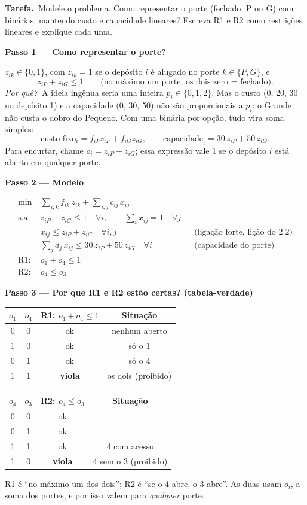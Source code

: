 \documentclass[11pt,a4paper]{article}
\newcommand{\tarefa}{\par\textbf{Tarefa.}\ }
\newcommand{\passo}[1]{\par\medskip\textbf{#1}\par}
\newcommand{\porque}{\textit{Por quê?}\ }
\begin{document}
\tarefa Modele o problema. Como representar o porte (fechado, P ou G) com binárias, mantendo custo e
capacidade lineares? Escreva R1 e R2 como restrições lineares e explique cada uma.

\passo{Passo 1 --- Como representar o porte?}
$z_{ik}\in\{0,1\}$, com $z_{ik}=1$ se o depósito $i$ é alugado no porte $k\in\{P,G\}$, e
\[
  z_{iP} + z_{iG} \le 1 \qquad \text{(no máximo um porte; os dois zero = fechado).}
\]
\porque A ideia ingênua seria uma inteira $p_i\in\{0,1,2\}$. Mas o custo (0, 20, 30 no depósito 1) e a capacidade
(0, 30, 50) não são proporcionais a $p_i$: o Grande não custa o dobro do Pequeno. Com uma binária por opção, tudo vira
soma simples:
\[
  \text{custo fixo}_i = f_{iP}z_{iP} + f_{iG}z_{iG}, \qquad \text{capacidade}_i = 30\,z_{iP} + 50\,z_{iG}.
\]
Para encurtar, chame $o_i = z_{iP}+z_{iG}$; essa expressão vale 1 se o depósito $i$ está aberto em qualquer porte.

\passo{Passo 2 --- Modelo}
\begin{align*}
  \min\ & \sum_{i,k} f_{ik}\,z_{ik} + \sum_{i,j} c_{ij}\,x_{ij}\\
  \text{s.a.}\ & z_{iP}+z_{iG} \le 1 \quad\forall i, \qquad \sum_i x_{ij} = 1 \quad\forall j\\
  & x_{ij} \le z_{iP}+z_{iG} \quad\forall i,j && \text{(ligação forte, lição do 2.2)}\\
  & \sum_j d_j\,x_{ij} \le 30\,z_{iP} + 50\,z_{iG} \quad\forall i && \text{(capacidade do porte)}\\
  \text{R1:}\ & o_1 + o_4 \le 1\\
  \text{R2:}\ & o_4 \le o_3
\end{align*}

\passo{Passo 3 --- Por que R1 e R2 estão certas? (tabela-verdade)}
\begin{center}
\begin{tabular}{cc|cc}
\toprule
$o_1$ & $o_4$ & R1: $o_1+o_4\le1$ & Situação\\
\midrule
0 & 0 & ok & nenhum aberto\\
1 & 0 & ok & só o 1\\
0 & 1 & ok & só o 4\\
1 & 1 & \textbf{viola} & os dois (proibido)\\
\bottomrule
\end{tabular}
\qquad
\begin{tabular}{cc|cc}
\toprule
$o_4$ & $o_3$ & R2: $o_4\le o_3$ & Situação\\
\midrule
0 & 0 & ok & \\
0 & 1 & ok & \\
1 & 1 & ok & 4 com acesso\\
1 & 0 & \textbf{viola} & 4 sem o 3 (proibido)\\
\bottomrule
\end{tabular}
\end{center}
R1 é ``no máximo um dos dois''; R2 é ``se o 4 abre, o 3 abre''. As duas usam $o_i$, a soma dos portes, e
por isso valem para \emph{qualquer} porte.
\end{document}
